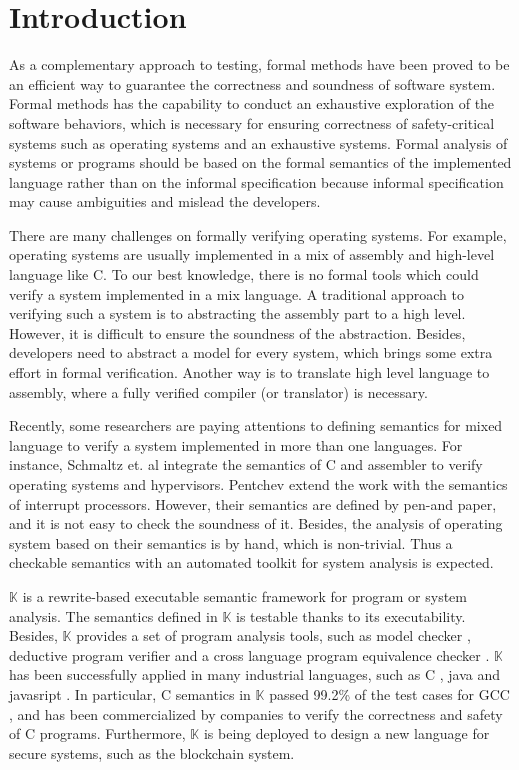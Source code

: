 \documentclass[letterpaper, 10 pt, conference]{IEEEtran}
\begin{document}
\section{Introduction}
\par As a complementary approach to testing, formal methods have been proved to be an efficient way to  guarantee the correctness and soundness of software system.
 Formal methods has the capability to conduct an exhaustive exploration of the software behaviors, which is necessary for ensuring correctness of safety-critical systems such as operating systems and an exhaustive systems. Formal analysis of systems or programs should be based on the formal semantics of the implemented language rather than on the informal specification because informal specification may cause ambiguities and mislead the developers.


 There are many challenges on formally verifying operating systems. For example, operating systems are usually implemented in a mix of assembly and high-level language like C. To our best knowledge, there is no formal tools which could verify a system implemented in a mix language. A traditional approach to verifying such a system is to abstracting the assembly part to a high level. However, it is difficult to ensure the soundness of the abstraction. Besides, developers need to abstract a model for every system, which brings some extra effort in formal verification. Another way is to translate high level language to assembly, where a fully verified compiler (or translator) is necessary.

 Recently, some researchers are paying attentions to defining semantics for mixed language to verify a system implemented in more than one languages. For instance, Schmaltz et. al \cite{Schmaltz} integrate the semantics of C and assembler to verify operating systems and hypervisors. Pentchev extend the work \cite{Pentchev} with the semantics of interrupt processors. However, their semantics are defined by pen-and paper, and it is not easy to check the soundness of it. Besides, the analysis of operating system based on their semantics is by hand, which is non-trivial. Thus a checkable semantics with an automated toolkit for system analysis is expected.

 $\mathbb{K}$ \cite{K} is a rewrite-based executable semantic framework for program or system analysis. The semantics defined in $\mathbb{K}$ is testable thanks to its executability. Besides, $\mathbb{K}$ provides a set of program analysis tools, such as model checker \cite{modelchecking}, deductive
 program verifier \cite{deductive} and a cross language program
 equivalence checker \cite{equivalence}. $\mathbb{K}$ has been successfully applied in many industrial languages, such as C \cite{C1}, java \cite{java} and javasript \cite{js}. In particular, C semantics in $\mathbb{K}$ passed 99.2\% of the test cases for GCC \cite{ellison}, and has been commercialized by companies to verify the correctness and safety of C programs. Furthermore, $\mathbb{K}$ is being deployed to design a new language for secure systems, such as the blockchain system.
\end{document}
